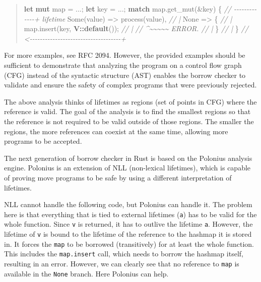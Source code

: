 \documentclass[
  11pt,
  twoside,symmetric]{report}
\newenvironment{Shaded}{}{}
\newcommand{\CommentTok}[1]{\textit{#1}}
\newcommand{\ConstantTok}[1]{#1}
\newcommand{\ControlFlowTok}[1]{\textbf{#1}}
\newcommand{\KeywordTok}[1]{\textbf{#1}}
\newcommand{\NormalTok}[1]{#1}
\newcommand{\OperatorTok}[1]{#1}
\newcommand{\PreprocessorTok}[1]{\textbf{#1}}
\begin{document}
\begin{quote}
\begin{Shaded}
\begin{Highlighting}[]
\KeywordTok{let} \KeywordTok{mut}\NormalTok{ map }\OperatorTok{=} \OperatorTok{...;}
\KeywordTok{let}\NormalTok{ key }\OperatorTok{=} \OperatorTok{...;}
\ControlFlowTok{match}\NormalTok{ map}\OperatorTok{.}\NormalTok{get\_mut(}\OperatorTok{\&}\NormalTok{key) }\OperatorTok{\{} \CommentTok{// {-}{-}{-}{-}{-}{-}{-}{-}{-}{-}{-}{-}{-}+ \textquotesingle{}lifetime}
    \ConstantTok{Some}\NormalTok{(value) }\OperatorTok{=\textgreater{}}\NormalTok{ process(value)}\OperatorTok{,}     \CommentTok{// |}
    \ConstantTok{None} \OperatorTok{=\textgreater{}} \OperatorTok{\{}                          \CommentTok{// |}
\NormalTok{        map}\OperatorTok{.}\NormalTok{insert(key}\OperatorTok{,} \PreprocessorTok{V::}\KeywordTok{default}\NormalTok{())}\OperatorTok{;} \CommentTok{// |}
        \CommentTok{//  \^{}\textasciitilde{}\textasciitilde{}\textasciitilde{}\textasciitilde{}\textasciitilde{} ERROR.              // |}
    \OperatorTok{\}}                                  \CommentTok{// |}
\OperatorTok{\}} \CommentTok{// \textless{}{-}{-}{-}{-}{-}{-}{-}{-}{-}{-}{-}{-}{-}{-}{-}{-}{-}{-}{-}{-}{-}{-}{-}{-}{-}{-}{-}{-}{-}{-}{-}{-}{-}{-}{-}{-}+}
\end{Highlighting}
\end{Shaded}
\end{quote}

For more examples, see RFC 2094.
However, the provided examples should be sufficient to demonstrate that
analyzing the program on a control flow graph (CFG) instead of the
syntactic structure (AST) enables the borrow checker to validate and
ensure the safety of complex programs that were previously rejected.

The above analysis thinks of lifetimes as regions (set of points in CFG)
where the reference is valid. The goal of the analysis is to find the
smallest regions so that the reference is not required to be valid
outside of those regions. The smaller the regions, the more references
can coexist at the same time, allowing more programs to be accepted.

The next generation of borrow checker in Rust is based on the Polonius
analysis engine. Polonius is an extension of NLL (non-lexical
lifetimes), which is capable of proving move programs to be safe by
using a different interpretation of lifetimes.

NLL cannot handle the following code, but Polonius can handle it. The
problem here is that everything that is tied to external lifetimes
(\texttt{\textquotesingle{}a}) has to be valid for the whole function.
Since \texttt{v} is returned, it has to outlive the lifetime
\texttt{\textquotesingle{}a}. However, the lifetime of \texttt{v} is
bound to the lifetime of the reference to the hashmap it is stored in.
It forces the \texttt{map} to be borrowed (transitively) for at least
the whole function. This includes the \texttt{map.insert} call, which
needs to borrow the hashmap itself, resulting in an error. However, we
can clearly see that no reference to \texttt{map} is available in the
\texttt{None} branch. Here Polonius can help.
\end{document}
